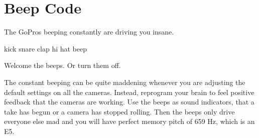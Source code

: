 \chapter{Beep Code}
\pagecolor{white}
\label{chap:17}
\begin{fullwidth}


\problem

{\large The GoPros beeping constantly are driving you insane. 

 \par}

kick
snare
clap
hi hat
beep



\solution

{\large Welcome the beeps. Or turn them off. 


 \par}

The constant beeping can be quite maddening whenever you are adjusting the default settings on all the cameras.  Instead, reprogram your brain to feel positive feedback that the cameras are working. Use the beeps as sound indicators, that a take has begun or a camera has stopped rolling. Then the beeps only drive everyone else mad and you will have perfect memory pitch of 659 Hz, which is an E5.






\clearpage
\end{fullwidth}
